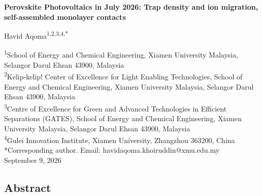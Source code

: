 \documentclass[
  11pt,
]{article}
\author{}
\date{}
\begin{document}
\begin{center}
{\LARGE\bfseries Perovskite Photovoltaics in July 2026: Trap density and ion migration, self-assembled monolayer contacts\par}
\vspace{1.1em}
{\large Havid Aqoma\textsuperscript{1,2,3,4,*}\par}
\vspace{0.7em}
\begin{minipage}{\textwidth}\centering\small
\textsuperscript{1}School of Energy and Chemical Engineering, Xiamen University Malaysia, Selangor Darul Ehsan 43900, Malaysia\\[0.25em]
\textsuperscript{2}Kelip-kelip! Center of Excellence for Light Enabling Technologies, School of Energy and Chemical Engineering, Xiamen University Malaysia, Selangor Darul Ehsan 43900, Malaysia\\[0.25em]
\textsuperscript{3}Centre of Excellence for Green and Advanced Technologies in Efficient Separations (GATES), School of Energy and Chemical Engineering, Xiamen University Malaysia, Selangor Darul Ehsan 43900, Malaysia\\[0.25em]
\textsuperscript{4}Gulei Innovation Institute, Xiamen University, Zhangzhou 363200, China\\[0.55em]
*Corresponding author. Email: havidaqoma.khoiruddin@xmu.edu.my\\[2.0em]
September 9, 2026
\end{minipage}
\end{center}
\vspace{0.8em}

\subsection{Abstract}\label{abstract}
\end{document}
